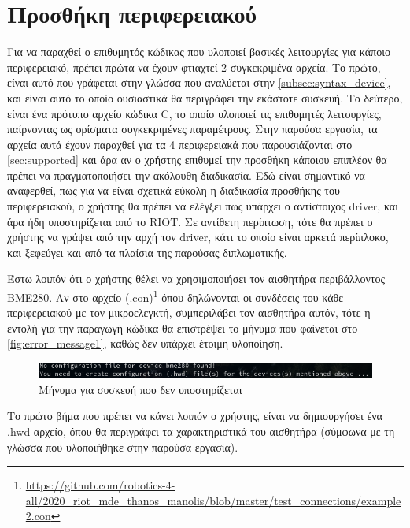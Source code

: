 \section{Προσθήκη περιφερειακού}
\label{sec:example2}

Για να παραχθεί ο επιθυμητός κώδικας που υλοποιεί βασικές λειτουργίες για κάποιο περιφερειακό, πρέπει πρώτα να έχουν φτιαχτεί 2 συγκεκριμένα αρχεία. Το πρώτο, είναι αυτό που γράφεται στην γλώσσα που αναλύεται στην \autoref{subsec:syntax_device}, και είναι αυτό το οποίο ουσιαστικά θα περιγράφει την εκάστοτε συσκευή. Το δεύτερο, είναι ένα πρότυπο αρχείο κώδικα C, το οποίο υλοποιεί τις επιθυμητές λειτουργίες, παίρνοντας ως ορίσματα συγκεκριμένες παραμέτρους. Στην παρούσα εργασία, τα αρχεία αυτά έχουν παραχθεί για τα 4 περιφερειακά που παρουσιάζονται στο \autoref{sec:supported} και άρα αν ο χρήστης επιθυμεί την προσθήκη κάποιου επιπλέον θα πρέπει να πραγματοποιήσει την ακόλουθη διαδικασία. Εδώ είναι σημαντικό να αναφερθεί, πως για να είναι σχετικά εύκολη η διαδικασία προσθήκης του περιφερειακού, ο χρήστης θα πρέπει να ελέγξει πως υπάρχει ο αντίστοιχος driver, και άρα ήδη υποστηρίζεται από το RIOT. Σε αντίθετη περίπτωση, τότε θα πρέπει ο χρήστης να γράψει από την αρχή τον driver, κάτι το οποίο είναι αρκετά περίπλοκο, και ξεφεύγει και από τα πλαίσια της παρούσας διπλωματικής.

Έστω λοιπόν ότι ο χρήστης θέλει να χρησιμοποιήσει τον αισθητήρα περιβάλλοντος BME280. Αν στο αρχείο (.con)\footnote{\url{https://github.com/robotics-4-all/2020_riot_mde_thanos_manolis/blob/master/test_connections/example2.con}} όπου δηλώνονται οι συνδέσεις του κάθε περιφερειακού με τον μικροελεγκτή, συμπεριλάβει τον αισθητήρα αυτόν, τότε η εντολή για την παραγωγή κώδικα θα επιστρέψει το μήνυμα που φαίνεται στο \autoref{fig:error_message1}, καθώς δεν υπάρχει έτοιμη υλοποίηση.

\begin{figure}[!ht]
	\centering
	\includegraphics[width=1.0\textwidth]{./images/chapter6/error_message1.png}
	\caption{Μήνυμα για συσκευή που δεν υποστηρίζεται}
	\label{fig:error_message1}
\end{figure}

Το πρώτο βήμα που πρέπει να κάνει λοιπόν ο χρήστης, είναι να δημιουργήσει ένα .hwd αρχείο, όπου θα περιγράφει τα χαρακτηριστικά του αισθητήρα (σύμφωνα με τη γλώσσα που υλοποιήθηκε στην παρούσα εργασία).

